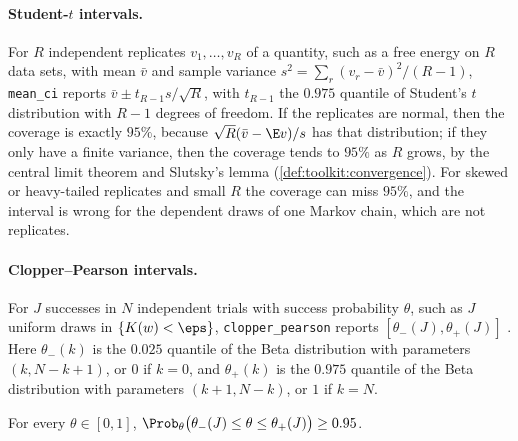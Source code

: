 \begin{refsection}
\paragraph{Student-$t$ intervals.} For $R$ independent replicates $v_1,\dots,v_R$ of a quantity, such as a free energy on $R$ data sets, with mean $\bar v$ and sample variance $s^2=\sum_r(v_r-\bar v)^2/(R-1)$, \texttt{mean\_ci} reports $\bar v\pm t_{R-1}s/\sqrt R$, with $t_{R-1}$ the $0.975$ quantile of Student's $t$ distribution with $R-1$ degrees of freedom. If the replicates are normal, then the coverage is exactly $95\%$, because $\sqrt R(\bar v-\E v)/s$ has that distribution; if they only have a finite variance, then the coverage tends to $95\%$ as $R$ grows, by the central limit theorem and Slutsky's lemma (\cref{def:toolkit:convergence}). For skewed or heavy-tailed replicates and small $R$ the coverage can miss $95\%$, and the interval is wrong for the dependent draws of one Markov chain, which are not replicates.

\paragraph{Clopper--Pearson intervals.} For $J$ successes in $N$ independent trials with success probability $\theta$, such as $J$ uniform draws in $\{K(w)<\eps\}$, \texttt{clopper\_\allowbreak pearson} reports $[\theta_-(J),\theta_+(J)]$ \parencite{ClopperPearson1934}. Here $\theta_-(k)$ is the $0.025$ quantile of the Beta distribution with parameters $(k,N-k+1)$, or $0$ if $k=0$, and $\theta_+(k)$ is the $0.975$ quantile of the Beta distribution with parameters $(k+1,N-k)$, or $1$ if $k=N$.

\begin{proposition}\label{prop:toolkit:clopper}
For every $\theta\in[0,1]$, $\Prob_\theta\bigl(\theta_-(J)\le\theta\le\theta_+(J)\bigr)\ge0.95$.
\end{proposition}


\end{refsection}
